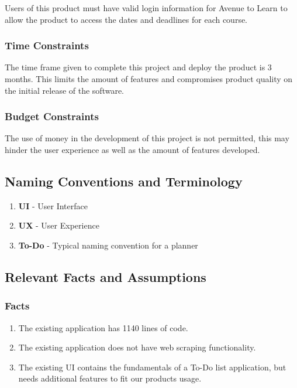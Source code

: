 \documentclass[12pt, titlepage]{article}
\begin{document}
Users of this product must have valid login information for Avenue to Learn to allow the product to access the dates and deadlines for each course.

\subsubsection{Time Constraints}

The time frame given to complete this project and deploy the product is 3 months. This limits the amount of features and compromises product quality on the initial release of the software.

\subsubsection{Budget Constraints}

The use of money in the development of this project is not permitted, this may hinder the user experience as well as the amount of features developed.

\subsection{Naming Conventions and Terminology}

\begin{enumerate}
\item \textbf{UI} - User Interface
\item \textbf{UX} - User Experience
\item \textbf{To-Do} - Typical naming convention for a planner
\end{enumerate}

\subsection{Relevant Facts and Assumptions}

\subsubsection{Facts}

\begin{enumerate}
\item The existing application has 1140 lines of code.
\item The existing application does not have web scraping functionality.
\item The existing UI contains the fundamentals of a To-Do list application, but needs additional features to fit our products usage.
\end{enumerate}
\end{document}
